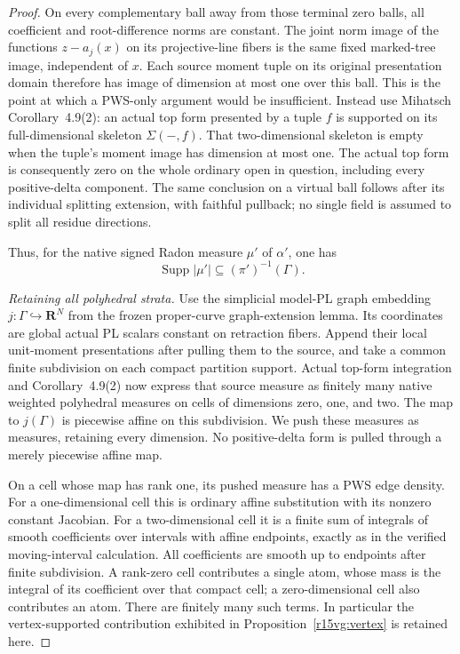 \begin{proof}
On every complementary ball away from those terminal zero
balls, all coefficient and root-difference norms are constant.
The joint norm image of the functions $z-a_j(x)$ on its
projective-line fibers is the same fixed marked-tree image,
independent of $x$.  Each source moment tuple on its original
presentation domain therefore has image of dimension at most
one over this ball.  This is the point at which a PWS-only
argument would be insufficient.  Instead use Mihatsch
Corollary~4.9(2): an actual top form presented by a tuple $f$
is supported on its full-dimensional skeleton $\Sigma(-,f)$.
That two-dimensional skeleton is empty when the tuple's
moment image has dimension at most one.  The actual top form
is consequently zero on the whole ordinary open in question,
including every positive-delta component.  The same conclusion
on a virtual ball follows after its individual splitting
extension, with faithful pullback; no single field is assumed
to split all residue directions.

Thus, for the native signed Radon measure $\mu'$ of
$\alpha'$, one has
\[
                \operatorname{Supp}|\mu'|
                       \subseteq(\pi')^{-1}(\Gamma).
\tag{TC15.6}\label{r15tc:graph-support}
\]

\emph{Retaining all polyhedral strata.}
Use the simplicial model-PL graph embedding
$j:\Gamma\hookrightarrow\mathbf R^N$ from the frozen
proper-curve graph-extension lemma.  Its coordinates are
global actual PL scalars constant on retraction fibers.
Append their local unit-moment presentations after pulling
them to the source, and take a common finite subdivision
on each compact partition support.  Actual top-form
integration and Corollary~4.9(2) now express that source
measure as finitely many native weighted polyhedral
measures on cells of dimensions zero, one, and two.
The map to $j(\Gamma)$ is piecewise affine on this
subdivision.  We push these measures as measures, retaining
every dimension.  No positive-delta form is pulled through
a merely piecewise affine map.

On a cell whose map has rank one, its pushed measure has
a PWS edge density.  For a one-dimensional cell this is
ordinary affine substitution with its nonzero constant
Jacobian.  For a two-dimensional cell it is a finite sum
of integrals of smooth coefficients over intervals with
affine endpoints, exactly as in the verified moving-interval
calculation.  All coefficients are smooth up to endpoints
after finite subdivision.  A rank-zero cell contributes a
single atom, whose mass is the integral of its coefficient
over that compact cell; a zero-dimensional cell also
contributes an atom.  There are finitely many such terms.
In particular the vertex-supported contribution exhibited
in Proposition~\ref{r15vg:vertex} is retained here.


\end{proof}
